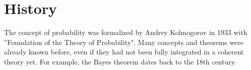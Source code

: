 

\section{History}


\begin{fullwidth}
The concept of probability was formalized by Andrey Kolmogorov in 1933 with ''Foundation of the Theory of Probability". Many concepts and theorems were already known before, even if they had not been fully integrated in a coherent theory yet. For example, the Bayes theorem dates back to the 18th century. 
\end{fullwidth}




